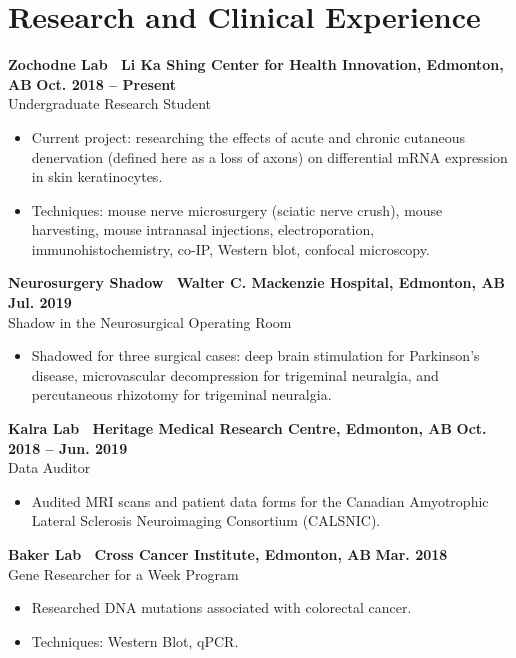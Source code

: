 \documentclass{article}
\begin{document}
\section*{\textcolor{my_red}{Research and Clinical Experience}}
    \textbf{Zochodne Lab \textbar\ Li Ka Shing Center for Health Innovation, Edmonton, AB} \hfill \textbf{Oct. 2018 -- Present}\\
    Undergraduate Research Student
    \begin{itemize}
        \item Current project: researching the effects of acute and chronic cutaneous denervation (defined here as a loss of axons) on differential mRNA expression in skin keratinocytes.
        \item Techniques: mouse nerve microsurgery (sciatic nerve crush), mouse harvesting, mouse intranasal injections, electroporation, immunohistochemistry, co-IP, Western blot, confocal microscopy.
    \end{itemize}

    \textbf{Neurosurgery Shadow \textbar\ Walter C. Mackenzie Hospital, Edmonton, AB} \hfill \textbf{Jul. 2019}\\
    Shadow in the Neurosurgical Operating Room
    \begin{itemize}
        \item Shadowed for three surgical cases: deep brain stimulation for Parkinson's disease, microvascular decompression for trigeminal neuralgia, and percutaneous rhizotomy for trigeminal neuralgia.
    \end{itemize}

    \textbf{Kalra Lab \textbar\ Heritage Medical Research Centre, Edmonton, AB} \hfill  \textbf{Oct. 2018 -- Jun. 2019}\\
    Data Auditor
    \begin{itemize}
        \item Audited MRI scans and patient data forms for the Canadian Amyotrophic Lateral Sclerosis Neuroimaging Consortium (CALSNIC).
    \end{itemize}

    \textbf{Baker Lab \textbar\ Cross Cancer Institute, Edmonton, AB} \hfill \textbf{Mar. 2018}\\
    Gene Researcher for a Week Program
    \begin{itemize}
        \item Researched DNA mutations associated with colorectal cancer.
        \item Techniques: Western Blot, qPCR.
    \end{itemize}
\end{document}
